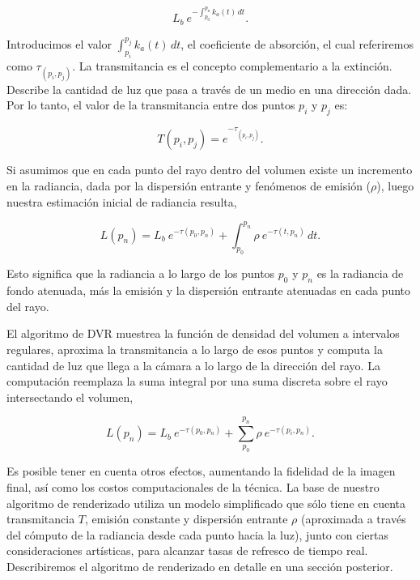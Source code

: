\begin{equation} \label{eq:radiance_absorption}  
    L_b \ e^{- \textstyle  \int_{p_0}^{p_n} k_a(t) \, dt}.
\end{equation}

Introducimos el valor $\int_{p_i}^{p_j} k_a(t) \, dt$, el coeficiente de absorción, el cual referiremos como $\tau_{(p_i, p_j)}$. 
La transmitancia es el concepto complementario a la extinción. Describe la cantidad de luz que pasa a través de un medio en una dirección dada.
Por lo tanto, el valor de la transmitancia entre dos puntos $p_i$ y $p_j$ es:

\begin{equation} \label{eq:transmittance}  
  T(p_i,p_j) = e^{- \textstyle \tau_{(p_i, p_j)}}.
\end{equation}

Si asumimos que en cada punto del rayo dentro del volumen existe un incremento en la radiancia, dada por la dispersión entrante y fenómenos de emisión ($\rho$), luego nuestra estimación inicial de radiancia resulta,

\begin{equation} \label{eq:ray_radiance}  
  L(p_n) = L_b \ e^{-\tau(p_0, p_n)} + \int_{p_0}^{p_n} \rho \ e^{-\tau(t,p_n)} \, dt.
\end{equation}

Esto significa que la radiancia a lo largo de los puntos $p_0$ y $p_n$ es la radiancia de fondo atenuada, más la emisión y la dispersión entrante atenuadas en cada punto del rayo.

El algoritmo de DVR muestrea la función de densidad del volumen a intervalos regulares, aproxima la transmitancia a lo largo de esos puntos y computa la cantidad de luz que llega a la cámara a lo largo de la dirección del rayo.
La computación reemplaza la suma integral por una suma discreta sobre el rayo intersectando el volumen,

\begin{equation} \label{eq:ray_radiance}  
  L(p_n) = L_b \ e^{-\tau(p_0, p_n)} + \sum_{p_0}^{p_n} \rho \ e^{-\tau(p_i,p_n)}.
\end{equation}

Es posible tener en cuenta otros efectos, aumentando la fidelidad de la imagen final, así como los costos computacionales de la técnica.
La base de nuestro algoritmo de renderizado utiliza un modelo simplificado que sólo tiene en cuenta transmitancia $T$, emisión constante y dispersión entrante $\rho$ (aproximada a través del cómputo de la radiancia desde cada punto hacia la luz), junto con ciertas consideraciones artísticas, para alcanzar tasas de refresco de tiempo real.
Describiremos el algoritmo de renderizado en detalle en una sección posterior.

